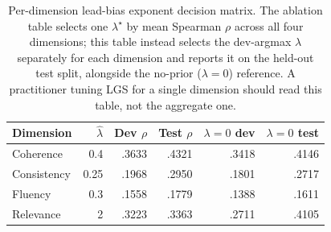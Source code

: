 \begin{table}[t]
\centering
\caption{Per-dimension lead-bias exponent decision matrix. The ablation table selects one $\lambda^{\star}$ by mean Spearman $\rho$ across all four dimensions; this table instead selects the dev-argmax $\lambda$ separately for each dimension and reports it on the held-out test split, alongside the no-prior ($\lambda{=}0$) reference. A practitioner tuning LGS for a single dimension should read this table, not the aggregate one.}
\label{tab:lambdadim}
\small
\linespread{1}\selectfont
\begin{tabular}{@{}lrrrrr@{}}
\toprule
Dimension & $\hat\lambda$ & Dev $\rho$ & Test $\rho$ & $\lambda{=}0$ dev & $\lambda{=}0$ test \\
\midrule
Coherence & 0.4 & .3633 & .4321 & .3418 & .4146 \\
Consistency & 0.25 & .1968 & .2950 & .1801 & .2717 \\
Fluency & 0.3 & .1558 & .1779 & .1388 & .1611 \\
Relevance & 2 & .3223 & .3363 & .2711 & .4105 \\
\bottomrule
\end{tabular}
\end{table}
